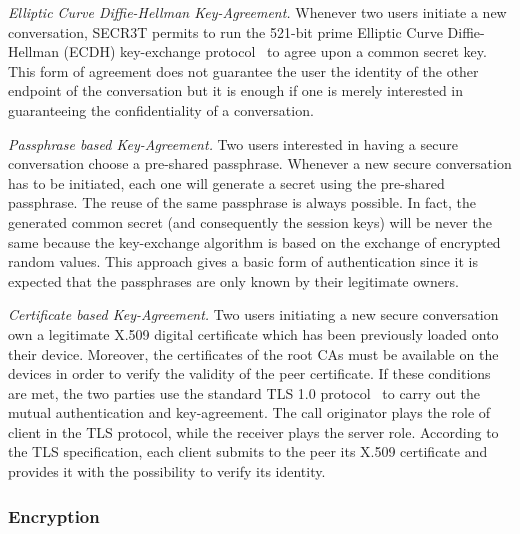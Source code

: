 \documentclass[10pt, conference, compsocconf]{IEEEtran}
\begin{document}
\begin{list}{}{\leftmargin=1em}
  \item \textit{Elliptic Curve Diffie-Hellman Key-Agreement.} Whenever two users initiate a new conversation, SECR3T permits to run the 521-bit prime Elliptic Curve Diffie-Hellman (ECDH) key-exchange protocol~\cite{ecc} to agree upon a common secret key. This form of agreement does not guarantee the user the identity of the other endpoint of the conversation but it is enough if one is merely interested in guaranteeing the confidentiality of a conversation.
  \item \textit{Passphrase based Key-Agreement.} Two users interested in having a secure conversation choose a pre-shared passphrase. Whenever a new secure conversation has to be initiated, each one will generate a secret using the pre-shared passphrase. The reuse of the same passphrase is always possible. In fact, the generated common secret (and consequently the session keys) will be never the same because the key-exchange algorithm is based on the exchange of encrypted random values. This approach gives a basic form of authentication since it is expected that the passphrases are only known by their legitimate owners.
  \item \textit{Certificate based Key-Agreement.} Two users initiating a new secure conversation own a legitimate X.509 digital certificate which has been previously loaded onto their device. Moreover, the certificates of the root CAs must be available on the devices in order to verify the validity of the peer certificate. If these conditions are met, the two parties use the standard TLS 1.0 protocol~\cite{tls} to carry out the mutual authentication and key-agreement. The call originator plays the role of client in the TLS protocol, while the receiver plays the server role. According to the TLS specification, each client submits to the peer its X.509 certificate and provides it with the possibility to verify its identity.
\\
\end{list}


\subsubsection{Encryption}

\end{document}
